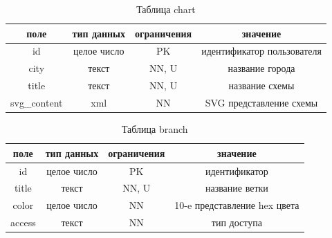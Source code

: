 \begin{table}[H]
    \begin{center}
        \caption{Таблица chart}
        \label{tbl:chart}
        \begin{tabular}{|c|c|c|c|}
            \hline
            поле & тип данных & ограничения & значение \\
            \hline
            id & целое число & PK & идентификатор пользователя \\
            \hline
            city & текст & NN, U & название города \\
            \hline
            title & текст & NN, U & название схемы \\
            \hline
            svg\_content & xml & NN & SVG представление схемы \\
            \hline
        \end{tabular}
    \end{center}    
\end{table}

\begin{table}[H]
    \begin{center}
        \caption{Таблица branch}
        \label{tbl:branch}
        \begin{tabular}{|c|c|c|c|}
            \hline
            поле & тип данных & ограничения & значение \\
            \hline
            id & целое число & PK & идентификатор \\
            \hline
            title & текст & NN, U & название ветки \\
            \hline
            color & целое число & NN & 10-e представление hex цвета \\
            \hline
            access & текст & NN & тип доступа \\
            \hline
        \end{tabular}
    \end{center}    
\end{table}

